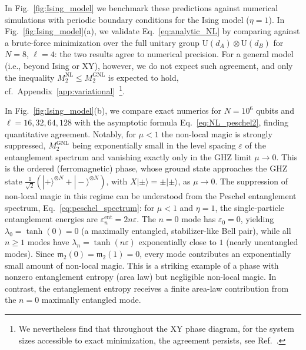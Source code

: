 \documentclass[prx,twocolumn,superscriptaddress,aps,10pt, frontmatterverbose, reprint,footinbib,longbibliography=true]{revtex4-2}
\providecommand{\DIFaddtex}[1]{{\protect\color{red}#1}} %
\providecommand{\DIFaddbegin}{\protect\color{red}} %
\providecommand{\DIFaddend}{\protect\color{black}} %
\providecommand{\DIFaddtex}[1]{\texorpdfstring{\DIFaddtex{#1}}{#1}} %
\providecommand{\DIFadd}[1]{\texorpdfstring{\DIFaddtex{#1}}{#1}} %
\newcommand{\DIFaddincludegraphics}[2][]{{\color{blue}\fbox{\DIFOincludegraphics[#1]{#2}}}} %
\DeclareRobustCommand{\DIFaddbegin}{\DIFOaddbegin \let\includegraphics\DIFaddincludegraphics} %
\DeclareRobustCommand{\DIFaddend}{\DIFOaddend \let\includegraphics\DIFOincludegraphics} %
\begin{document}
In Fig.~\ref{fig:Ising_model} we benchmark these predictions against numerical simulations with periodic boundary conditions for the Ising model ($\eta=1$).
In Fig.~\ref{fig:Ising_model}(a), we validate Eq.~\eqref{eq:analytic_NL} by comparing against a brute-force minimization over the full unitary group $\mathrm{U}(d_A)\otimes\mathrm{U}(d_B)$ for $N=8$, $\ell=4$: the two results agree to numerical precision. For a general model (i.e., beyond Ising or XY), however, we do not expect such agreement, and only the inequality
\DIFaddbegin \DIFadd{$M_2^{\mathrm{NL}}\le M_2^{\mathrm{GNL}}$ }\DIFaddend is expected to hold,
cf.~Appendix~\ref{app:variational}~\footnote{We nevertheless find that throughout the XY phase
diagram, for the system sizes accessible to exact minimization, the agreement persists, see Ref.~\cite{zenodo}.}.

In Fig.~\ref{fig:Ising_model}(b), we compare exact numerics for $N=10^6$ qubits and $\ell = 16,32,64,128$ with the asymptotic formula Eq.~\eqref{eq:NL_peschel2}, finding quantitative agreement. Notably, for $\mu<1$ the non-local magic is strongly suppressed, $M_2^{\mathrm{GNL}}$ being exponentially small in the level spacing $\varepsilon$ of the entanglement spectrum and vanishing exactly only in the GHZ limit $\mu\to0$. This is the ordered (ferromagnetic) phase, whose ground state approaches the GHZ state \DIFaddbegin \DIFadd{$\frac{1}{\sqrt{2}}(|{+}\rangle^{\otimes N}+|{-}\rangle^{\otimes N})$, with $X|{\pm}\rangle=\pm|{\pm}\rangle$, }\DIFaddend as $\mu\to 0$. The suppression of non-local magic in this regime can be understood from the Peschel entanglement spectrum, Eq.~\eqref{eq:peschel_spectrum}: for $\mu<1$ and $\eta=1$, the single-particle entanglement energies are $\varepsilon_n^{\mathrm{ent}}=2n\varepsilon$. The $n=0$ mode has $\varepsilon_0=0$, yielding $\lambda_0=\tanh(0)=0$ (a maximally entangled, stabilizer-like Bell pair), while all $n\ge 1$ modes have $\lambda_n=\tanh(n\varepsilon)$ exponentially close to $1$ (nearly unentangled modes). Since $\mathfrak{m}_2(0)=\mathfrak{m}_2(1)=0$, every mode contributes an exponentially small amount of non-local magic. This is a striking example of a phase with nonzero entanglement entropy (area law) but negligible  non-local magic. In contrast, the entanglement entropy receives a finite area-law contribution from the $n=0$ maximally entangled mode.
\end{document}
